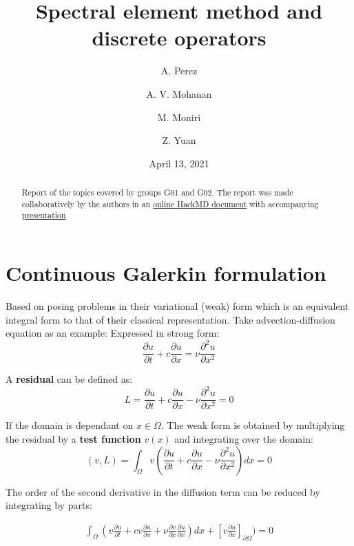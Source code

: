 \documentclass[
  a4paper,
  10pt]{article}
\title{Spectral element method and discrete operators}
\author{A. Perez \and A. V. Mohanan \and M. Moniri \and Z. Yuan}
\date{April 13, 2021}
\begin{document}
\maketitle
\begin{abstract}
Report of the topics covered by groups G01 and G02. The report was made
collaboratively by the authors in an
\href{https://hackmd.io/@jmtW1K-nT5O31NGGrCd6Pg/ByZNQkZH_}{online HackMD
document} with accompanying
\href{https://hackmd.io/@ashwinvis/B1PY2JorO}{presentation}
\end{abstract}

\hypertarget{continuous-galerkin-formulation}{%
\section{Continuous Galerkin
formulation}\label{continuous-galerkin-formulation}}

Based on posing problems in their variational (weak) form which is an
equivalent integral form to that of their classical representation. Take
advection-diffusion equation as an example: Expressed in strong form:
\begin{equation}
\frac{\partial{u}}{\partial{t}} + c \frac{\partial{u}}{\partial{x}} =  \nu \frac{\partial^{2}u}{\partial{x}^{2}}
\end{equation}

A \textbf{residual} can be defined as: \begin{equation}
L=\frac{\partial{u}}{\partial{t}} + c \frac{\partial{u}}{\partial{x}} -  \nu \frac{\partial^{2}u}{\partial{x}^{2}}=0
\end{equation}

If the domain is dependant on \(x \in \Omega\). The weak form is
obtained by multiplying the residual by a \textbf{test function}
\(v(x)\) and integrating over the domain: \begin{equation}
(v,L)=\int_{\Omega} v(\frac{\partial{u}}{\partial{t}} + c \frac{\partial{u}}{\partial{x}} -  \nu \frac{\partial^{2}u}{\partial{x}^{2}})dx=0
\end{equation}

The order of the second derivative in the diffusion term can be reduced
by integrating by parts:

\begin{align}
\int_{\Omega} (v\frac{\partial u}{\partial t} + cv\frac{\partial u}{\partial x} + \nu\frac{\partial v}{\partial x}\frac{\partial u}{\partial x})dx + [v\frac{\partial u}{\partial x}]_{\partial\Omega}) = 0
\end{align}
\end{document}
